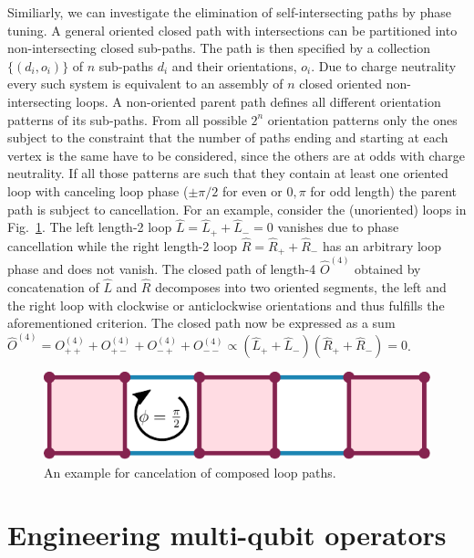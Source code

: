 \documentclass[twocolumn,floats,prx,showpacs]{revtex4-1}
\begin{document}
Similiarly, we can investigate the elimination of self-intersecting paths by phase tuning. A general oriented closed path with intersections can be partitioned into non-intersecting closed sub-paths. The path is then specified by a collection $\{(d_i,o_i)\}$ of $n$ sub-paths $d_i$ and their orientations, $o_i$.  Due to charge neutrality every such system is equivalent to an assembly of $n$ closed oriented non-intersecting loops. A non-oriented parent path defines all different orientation patterns of its sub-paths. From all possible $2^n$ orientation patterns only the ones subject to the constraint that the number of paths ending and starting at each vertex is the same have to be considered, since the others are at odds with charge neutrality. If all those patterns are such that they contain at least  one oriented loop with canceling loop phase ($\pm \pi/2$ for even or $0,\pi$ for odd length) the parent path is subject to cancellation. For an example, consider the (unoriented) loops in Fig.~\ref{fig:compose}. The left length-2 loop $\hat L= \hat L_+ + \hat L_-=0$ vanishes due to phase cancellation while the right length-2 loop $\hat R=\hat R_+ + \hat R_-$ has an arbitrary loop phase and does not vanish. The closed path of length-4 $\hat O^{(4)}$ obtained by concatenation of $\hat L$ and $\hat R$ decomposes into two oriented segments, the left and the right loop with clockwise or anticlockwise orientations and thus fulfills the aforementioned criterion. The closed path now be expressed as a sum $\hat O^{(4)}=O^{(4)}_{++}+O^{(4)}_{+-}+O^{(4)}_{-+}+O^{(4)}_{--} \propto (\hat L_+ + \hat L_-)(\hat R_+ + \hat R_-)=0$. 


\begin{figure}
\includegraphics[width=0.72 \columnwidth]{fig/compose.pdf}
\caption{An example for cancelation of composed loop paths.}
\label{fig:compose}
\end{figure}



\section{Engineering multi-qubit operators}\label{sec3}
\end{document}
